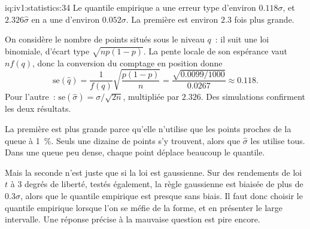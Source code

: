 \begin{solution}{iq:iv1:statistics:34}
Le quantile empirique a une erreur type d'environ $0.118\sigma$, et $2.326\hat\sigma$ en a une d'environ $0.052\sigma$. La première est environ $2.3$ fois plus grande.

On considère le nombre de points situés sous le niveau $q$~: il suit une loi binomiale, d'écart type $\sqrt{np(1 - p)}$. La pente locale de son espérance vaut $nf(q)$, donc la conversion du comptage en position donne
\[
\mathrm{se}(\hat{q}) = \frac{1}{f(q)}\sqrt{\frac{p(1 - p)}{n}} = \frac{\sqrt{0.0099/1000}}{0.0267} \approx 0.118.
\]
Pour l'autre~: $\mathrm{se}(\hat\sigma) = \sigma/\sqrt{2n}$, multipliée par $2.326$. Des simulations confirment les deux résultats.

La première est plus grande parce qu'elle n'utilise que les points proches de la queue à 1~\%. Seuls une dizaine de points s'y trouvent, alors que $\hat\sigma$ les utilise tous. Dans une queue peu dense, chaque point déplace beaucoup le quantile.

Mais la seconde n'est juste que si la loi est gaussienne. Sur des rendements de loi $t$ à 3 degrés de liberté, testés également, la règle gaussienne est biaisée de plus de $0.3\sigma$, alors que le quantile empirique est presque sans biais. Il faut donc choisir le quantile empirique lorsque l'on se méfie de la forme, et en présenter le large intervalle. Une réponse précise à la mauvaise question est pire encore.

\end{solution}

